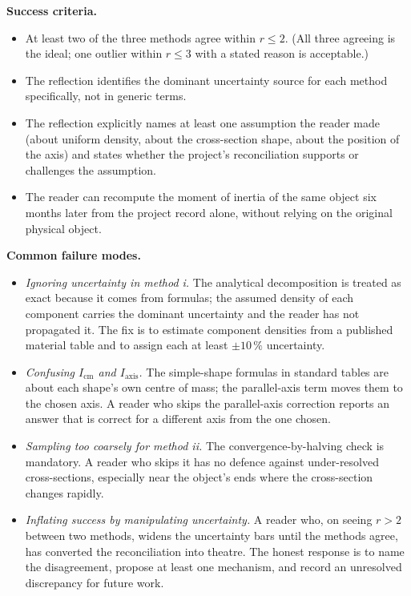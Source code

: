 \begin{project}
\textbf{Success criteria.}
\begin{itemize}[leftmargin=*]
  \item At least two of the three methods agree within
    $r \leq 2$. (All three agreeing is the ideal; one outlier
    within $r \leq 3$ with a stated reason is acceptable.)
  \item The reflection identifies the dominant uncertainty source
    for each method specifically, not in generic terms.
  \item The reflection explicitly names at least one assumption
    the reader made (about uniform density, about the
    cross-section shape, about the position of the axis) and
    states whether the project's reconciliation supports or
    challenges the assumption.
  \item The reader can recompute the moment of inertia of the
    same object six months later from the project record alone,
    without relying on the original physical object.
\end{itemize}

\textbf{Common failure modes.}
\begin{itemize}[leftmargin=*]
  \item \textit{Ignoring uncertainty in method i.} The
    analytical decomposition is treated as exact because it
    comes from formulas; the assumed density of each component
    carries the dominant uncertainty and the reader has not
    propagated it. The fix is to estimate component densities
    from a published material table and to assign each at least
    $\pm 10\,\%$ uncertainty.
  \item \textit{Confusing $I_{\mathrm{cm}}$ and $I_{\mathrm{axis}}$.}
    The simple-shape formulas in standard tables are about each
    shape's own centre of mass; the parallel-axis term moves them
    to the chosen axis. A reader who skips the parallel-axis
    correction reports an answer that is correct for a different
    axis from the one chosen.
  \item \textit{Sampling too coarsely for method ii.} The
    convergence-by-halving check is mandatory. A reader who skips
    it has no defence against under-resolved cross-sections,
    especially near the object's ends where the cross-section
    changes rapidly.
  \item \textit{Inflating success by manipulating uncertainty.}
    A reader who, on seeing $r > 2$ between two methods, widens
    the uncertainty bars until the methods agree, has converted
    the reconciliation into theatre. The honest response is to
    name the disagreement, propose at least one mechanism, and
    record an unresolved discrepancy for future work.
\end{itemize}
\end{project}

